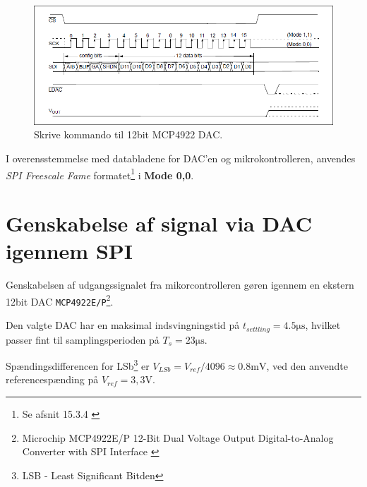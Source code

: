 \begin{figure}[h!]
	\centering
	\includegraphics[width=.8\textwidth]{billeder/dac12bit_writecmd.png}
	\caption{Skrive kommando til 12bit MCP4922 DAC.\cite[s. 25]{mcp4922}}
	\label{fig:dac12bit_writecmd}
\end{figure}

I overensstemmelse med databladene for DAC'en og mikrokontrolleren, anvendes \emph{SPI Freescale Fame} formatet\footnote{Se afsnit 15.3.4 \cite[s. 954]{tm4c123gh6pm}} i \textbf{Mode 0,0}.


\section{Genskabelse af signal via DAC igennem SPI}
Genskabelsen af udgangssignalet fra mikorcontrolleren gøren igennem en ekstern 12bit DAC \texttt{MCP4922E/P}\footnote{Microchip MCP4922E/P 12-Bit Dual Voltage Output Digital-to-Analog Converter with SPI Interface \cite{mcp4922} }.

Den valgte DAC har en maksimal indsvingningstid på $t_{settling} = \num{4.5}\si{\micro\second}$, hvilket passer fint til samplingsperioden på $T_s = 23\si{\micro\second}$.

Spændingsdifferencen for LSb\footnote{LSB - Least Significant Bitden} er $ V_{LSb} = V_{ref} / 4096 \approx \num{0,8}\si{\milli\volt} $, ved den anvendte referencespænding på $V_{ref} = 3,3\si{\volt}$.

 

